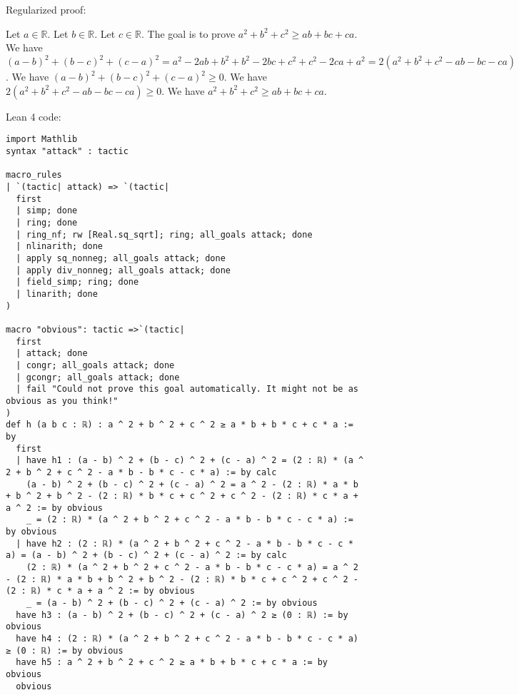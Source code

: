 \documentclass{article}
\begin{document}
Regularized proof:
\begin{tcolorbox}[colback=red!10, width=\linewidth]
Let $a\in\mathbb{R}$.
Let $b\in\mathbb{R}$.
Let $c\in\mathbb{R}$.
The goal is to prove $a^2+b^2+c^2 \ge ab+bc+ca$.
We have ${{(a-b)}}^2+{{(b-c)}}^2+{{(c-a)}}^2 = a^2 - 2ab + b^2 + b^2 - 2bc + c^2 + c^2 - 2ca + a^2 = 2(a^2+b^2+c^2 - ab - bc - ca)$.
We have ${{(a-b)}}^2+{{(b-c)}}^2+{{(c-a)}}^2 \ge 0$.
We have $2(a^2+b^2+c^2 - ab - bc - ca) \ge 0$.
We have $a^2+b^2+c^2 \ge ab+bc+ca$.
\end{tcolorbox}

Lean 4 code:
\begin{tcolorbox}[colback=white!10, width=\linewidth]
\begin{lstlisting}[language=Lean4]
import Mathlib
syntax "attack" : tactic

macro_rules
| `(tactic| attack) => `(tactic|
  first
  | simp; done
  | ring; done
  | ring_nf; rw [Real.sq_sqrt]; ring; all_goals attack; done
  | nlinarith; done
  | apply sq_nonneg; all_goals attack; done
  | apply div_nonneg; all_goals attack; done
  | field_simp; ring; done
  | linarith; done
)

macro "obvious": tactic =>`(tactic|
  first
  | attack; done
  | congr; all_goals attack; done
  | gcongr; all_goals attack; done
  | fail "Could not prove this goal automatically. It might not be as obvious as you think!"
)
def h (a b c : ℝ) : a ^ 2 + b ^ 2 + c ^ 2 ≥ a * b + b * c + c * a := by
  first
  | have h1 : (a - b) ^ 2 + (b - c) ^ 2 + (c - a) ^ 2 = (2 : ℝ) * (a ^ 2 + b ^ 2 + c ^ 2 - a * b - b * c - c * a) := by calc
    (a - b) ^ 2 + (b - c) ^ 2 + (c - a) ^ 2 = a ^ 2 - (2 : ℝ) * a * b + b ^ 2 + b ^ 2 - (2 : ℝ) * b * c + c ^ 2 + c ^ 2 - (2 : ℝ) * c * a + a ^ 2 := by obvious
    _ = (2 : ℝ) * (a ^ 2 + b ^ 2 + c ^ 2 - a * b - b * c - c * a) := by obvious
  | have h2 : (2 : ℝ) * (a ^ 2 + b ^ 2 + c ^ 2 - a * b - b * c - c * a) = (a - b) ^ 2 + (b - c) ^ 2 + (c - a) ^ 2 := by calc
    (2 : ℝ) * (a ^ 2 + b ^ 2 + c ^ 2 - a * b - b * c - c * a) = a ^ 2 - (2 : ℝ) * a * b + b ^ 2 + b ^ 2 - (2 : ℝ) * b * c + c ^ 2 + c ^ 2 - (2 : ℝ) * c * a + a ^ 2 := by obvious
    _ = (a - b) ^ 2 + (b - c) ^ 2 + (c - a) ^ 2 := by obvious
  have h3 : (a - b) ^ 2 + (b - c) ^ 2 + (c - a) ^ 2 ≥ (0 : ℝ) := by obvious
  have h4 : (2 : ℝ) * (a ^ 2 + b ^ 2 + c ^ 2 - a * b - b * c - c * a) ≥ (0 : ℝ) := by obvious
  have h5 : a ^ 2 + b ^ 2 + c ^ 2 ≥ a * b + b * c + c * a := by obvious
  obvious

\end{lstlisting}
\end{tcolorbox}
\end{document}
